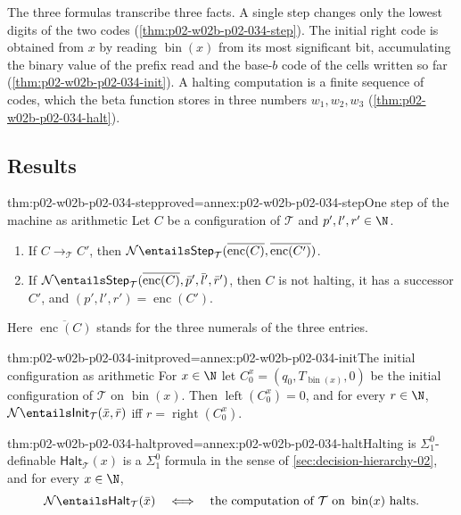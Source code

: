 The three formulas transcribe three facts.  A single step changes only the
lowest digits of the two codes (\cref{thm:p02-w02b-p02-034-step}).  The
initial right code is obtained from \(x\) by reading \(\operatorname{bin}(x)\)
from its most significant bit, accumulating the binary value of the prefix
read and the base-\(b\) code of the cells written so far
(\cref{thm:p02-w02b-p02-034-init}).  A halting computation is a finite
sequence of codes, which the beta function stores in three numbers
\(w_1,w_2,w_3\) (\cref{thm:p02-w02b-p02-034-halt}).

\subsection{Results}
\label{sec:p02-w02b-p02-034-results}

\begin{hblemma}{thm:p02-w02b-p02-034-step}{proved=annex:p02-w02b-p02-034-step}{One step of the machine as arithmetic}
Let \(C\) be a configuration of \(\mathcal T\) and \(p',l',r'\in\N\).
\begin{enumerate}
 \item If \(C\longrightarrow_{\mathcal T}C'\), then
   \(\mathcal N\entails\mathsf{Step}_{\mathcal T}(\overline{\operatorname{enc}(C)},\overline{\operatorname{enc}(C')})\).
 \item If
   \(\mathcal N\entails\mathsf{Step}_{\mathcal T}(\overline{\operatorname{enc}(C)},\bar p',\bar l',\bar r')\),
   then \(C\) is not halting, it has a successor \(C'\), and
   \((p',l',r')=\operatorname{enc}(C')\).
\end{enumerate}
Here \(\overline{\operatorname{enc}(C)}\) stands for the three numerals of
the three entries.
\end{hblemma}

\begin{hblemma}{thm:p02-w02b-p02-034-init}{proved=annex:p02-w02b-p02-034-init}{The initial configuration as arithmetic}
For \(x\in\N\) let \(C^x_0=(q_0,T_{\operatorname{bin}(x)},0)\) be the
initial configuration of \(\mathcal T\) on \(\operatorname{bin}(x)\).  Then
\(\operatorname{left}(C^x_0)=0\), and for every \(r\in\N\),
\(\mathcal N\entails\mathsf{Init}_{\mathcal T}(\bar x,\bar r)\) iff
\(r=\operatorname{right}(C^x_0)\).
\end{hblemma}

\begin{hbtheorem}{thm:p02-w02b-p02-034-halt}{proved=annex:p02-w02b-p02-034-halt}{Halting is \(\Sigma^0_1\)-definable}
\(\mathsf{Halt}_{\mathcal T}(x)\) is a \(\Sigma^0_1\) formula in the sense of
\cref{sec:decision-hierarchy-02}, and for every \(x\in\N\),
\[
 \mathcal N\entails\mathsf{Halt}_{\mathcal T}(\bar x)
 \quad\Longleftrightarrow\quad
 \text{the computation of }\mathcal T\text{ on }\operatorname{bin}(x)\text{ halts}.
\]
\end{hbtheorem}

